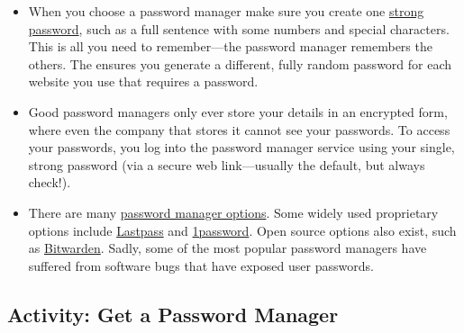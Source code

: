 \documentclass[
  letterpaper,
  DIV=11,
  numbers=noendperiod]{scrreprt}
\providecommand{\tightlist}{%
  \setlength{\itemsep}{0pt}\setlength{\parskip}{0pt}}\usepackage{longtable,booktabs,array}
\begin{document}
\begin{itemize}
\tightlist
\item
  When you choose a password manager make sure you create one
  \href{https://www.howtogeek.com/195430/how-to-create-a-strong-password-and-remember-it/}{strong
  password}, such as a full sentence with some numbers and special
  characters. This is all you need to remember---the password manager
  remembers the others. The ensures you generate a different, fully
  random password for each website you use that requires a password.
\item
  Good password managers only ever store your details in an encrypted
  form, where even the company that stores it cannot see your passwords.
  To access your passwords, you log into the password manager service
  using your single, strong password (via a secure web link---usually
  the default, but always check!).
\item
  There are many
  \href{https://www.google.co.nz/search?q=password+managers&bshm=rimc/1}{password
  manager options}. Some widely used proprietary options include
  \href{https://www.lastpass.com/}{Lastpass} and
  \href{https://1password.com/}{1password}. Open source options also
  exist, such as \href{https://bitwarden.com/}{Bitwarden}. Sadly, some
  of the most popular password managers have suffered from software bugs
  that have exposed user passwords.
\end{itemize}

\subsection{Activity: Get a Password
Manager}\label{activity-get-a-password-manager}
\end{document}
